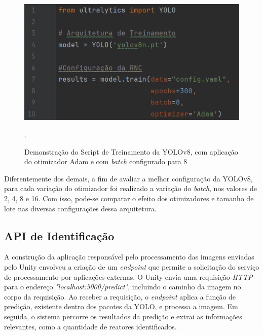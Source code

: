 \begin{figure}[!h]
    \centering
    \begin{minipage}{0.7\linewidth}
    \centering
    \captionsetup{justification=centering,margin=0.5cm,font=small}
    \includegraphics[width=1\linewidth]{img/cap5/yolov8-adam.png}
    \caption{Demonstração do Script de Treinamento da YOLOv8, com aplicação do otimizador Adam e com \textit{batch} configurado para 8}.
    \label{fig:script-yolov8}
    \end{minipage}
\end{figure}

Diferentemente dos demais, a fim de avaliar a melhor configuração da YOLOv8, para cada variação do otimizador foi realizado a variação do \textit{batch}, nos valores de 2, 4, 8 e 16. Com isso, pode-se comparar o efeito dos otimizadores e tamanho de lote nas diversas configurações dessa arquitetura.

\subsection{API de Identificação}

A construção da aplicação responsável pelo processamento das imagens enviadas pelo Unity envolveu a criação de um \textit{endpoint} que permite a solicitação do serviço de processamento por aplicações externas. O Unity envia uma requisição \textit{HTTP} para o endereço \textit{"localhost:5000/predict"}, incluindo o caminho da imagem no corpo da requisição. Ao receber a requisição, o \textit{endpoint} aplica a função de predição, existente dentro dos pacotes da YOLO, e processa a imagem. Em seguida, o sistema percorre os resultados da predição e extrai as informações relevantes, como a quantidade de reatores identificados.

